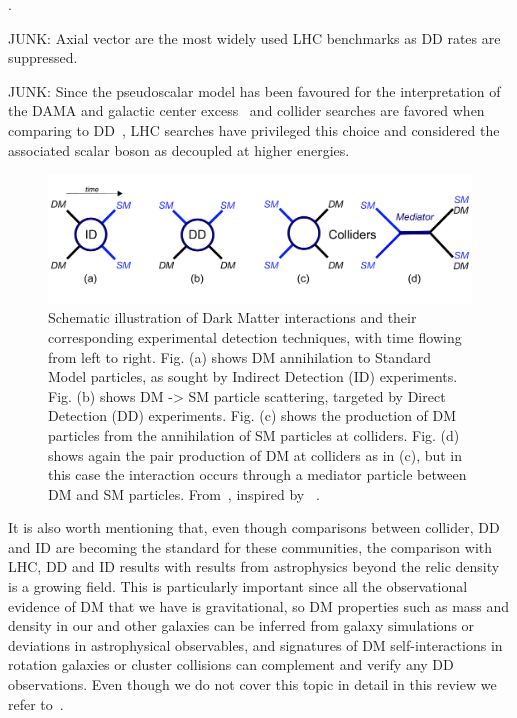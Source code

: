 \begin{marginnote}[]
\end{marginnote}. 

JUNK: Axial vector are the most widely used LHC benchmarks as DD rates are suppressed. 

JUNK: Since the pseudoscalar model has been favoured for the interpretation of the DAMA and galactic center excess~\cite{Arina:2014yna,Agrawal:2014una} and collider searches are favored when comparing to DD~\cite{Banerjee:2017wxi}, LHC searches have privileged this choice and considered the associated scalar boson as decoupled at higher energies. 


\begin{figure}[!htpb]
\includegraphics[width=\textwidth]{figures/EFTSimplifiedModels}
\caption{Schematic illustration of Dark Matter interactions and their corresponding experimental detection techniques, with time flowing from left to right. Fig. (a) shows DM annihilation to Standard Model particles, as sought by Indirect Detection (ID) experiments. Fig. (b) shows DM -> SM particle scattering, targeted by Direct Detection (DD) experiments. Fig. (c) shows the production of DM particles from the annihilation of SM particles at colliders. Fig. (d) shows again the pair production of DM at colliders as in (c), but in this case the interaction occurs through a mediator particle between DM and SM particles. From~\cite{monoXfig}, inspired by ~\cite{Bauer:2013ihz}.}
\label{fig:Complementarity}
\end{figure}

It is also worth mentioning that, even though comparisons between collider, DD and ID are becoming the standard for these communities,
the comparison with LHC, DD and ID results with results from astrophysics beyond the relic density is a growing field. 
This is particularly important since all the observational evidence of DM that we have is gravitational,
so DM properties such as mass and density in our and other galaxies
can be inferred from galaxy simulations or deviations in astrophysical observables, 
and signatures of DM self-interactions in rotation galaxies or cluster collisions can complement and verify any DD 
observations. Even though we do not cover this topic in detail in this review we refer to~\cite{Buckley:2017ijx}. 

